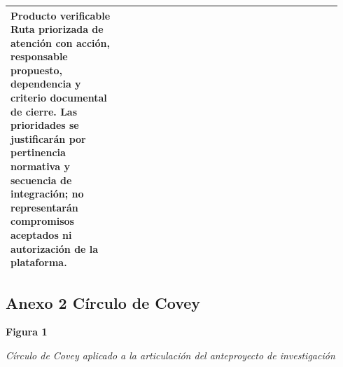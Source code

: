 {\begin{landscape}
\begin{longtable}{@{}p{0.31\linewidth}p{0.63\linewidth}@{}}
Producto verificable
Ruta priorizada de atención con acción, responsable propuesto, dependencia y criterio documental de cierre. Las prioridades se justificarán por pertinencia normativa y secuencia de integración; no representarán compromisos aceptados ni autorización de la plataforma.\\
\bottomrule\end{longtable}
\endgroup
\end{landscape}\clearpage\pagestyle{fancy}
\clearpage\pagestyle{empty}\begin{landscape}
\section*{Anexo 2 Círculo de Covey}
\noindent\textbf{Figura 1}\par
\textit{Círculo de Covey aplicado a la articulación del anteproyecto de investigación}\par\vspace{2mm}
\circulodecovey[0.64]
\par\vspace{2mm}
\end{landscape}\clearpage\pagestyle{fancy}
}

